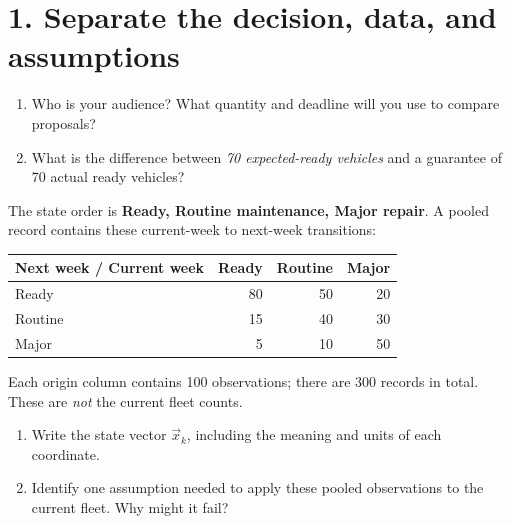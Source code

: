 \documentclass[10pt,letterpaper]{article}
\newcommand{\spacefor}[1]{\vspace{#1}}
\begin{document}
\section*{1. Separate the decision, data, and assumptions}
\begin{enumerate}[label=(\alph*),nosep]
\item Who is your audience? What quantity and deadline will you use to compare proposals?
\spacefor{0.35in}
\item What is the difference between \emph{70 expected-ready vehicles} and a guarantee of 70 actual ready vehicles?
\spacefor{0.4in}
\end{enumerate}
The state order is \textbf{Ready, Routine maintenance, Major repair}. A pooled record contains these current-week to next-week transitions:
\begin{center}
\begin{tabular}{lrrr}
\toprule
Next week / Current week & Ready & Routine & Major\\
\midrule
Ready &80&50&20\\
Routine &15&40&30\\
Major &5&10&50\\
\bottomrule
\end{tabular}
\end{center}
Each origin column contains 100 observations; there are 300 records in total. These are \emph{not} the current fleet counts.
\begin{enumerate}[label=(\alph*),resume,nosep]
\item Write the state vector $\vec{x}_k$, including the meaning and units of each coordinate.
\spacefor{0.45in}
\item Identify one assumption needed to apply these pooled observations to the current fleet. Why might it fail?
\spacefor{0.45in}
\end{enumerate}

\newpage
\end{document}
